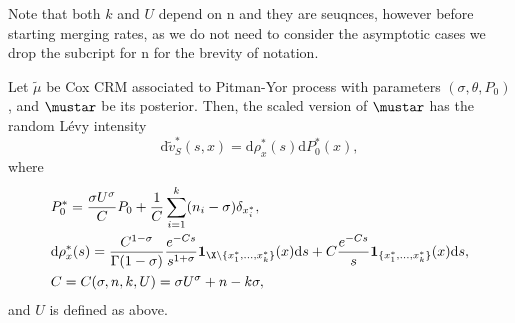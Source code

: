 Note that both $k$ and $U$ depend on n and they are seuqnces, however before starting merging rates, as we do not need to consider the asymptotic cases we drop the subcript for n for the brevity of notation.
\begin{proposition} 
    \label{proposition:posterior_pitmanyor}
    Let $\tilde{\mu}$ be Cox CRM associated to Pitman-Yor process with parameters $(\sigma, \theta, P_0)$, and $\mustar$ be its posterior. Then, the scaled version of $\mustar$ has the random L\'evy intensity 
    \[
    \mathrm{d}\tilde{v}^*_{S}(s,x) =  \mathrm{d}\rho_x^*(s)\mathrm{d}P^*_0(x),
    \]
    where
    \begin{align*}
        & P^*_0 = \frac{ \sigma U^\sigma}{C}P_0 + \frac{1}{C}\sum_{i = 1}^k (n_i - \sigma) \delta_{x_i^*},\\
        & \mathrm{d}\rho^*_x(s) = \frac{C^{1-\sigma}}{\Gamma(1-\sigma)}\frac{e^{-Cs}}{s^{1+\sigma}}\mathbf{1}_{\X \backslash\{x_1^*,\dots, x_k^*\}}(x)\mathrm{d}s + C\frac{e^{-Cs}}{s}\mathbf{1}_{\{x_1^*,\dots, x_k^*\}}(x)\mathrm{d}s, \\
        & C = C(\sigma, n, k, U) =  \sigma U^\sigma + n - k\sigma,
    \end{align*}
    and $U$ is defined as above.
\end{proposition}

